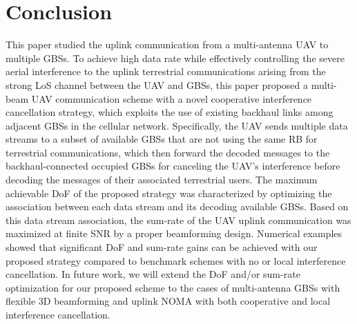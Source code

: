 \documentclass[onecolumn, draftclsnofoot, 12pt]{IEEEtran}
\begin{document}
\section{Conclusion}\label{sec:Conclusion}
This paper studied the uplink communication from a multi-antenna UAV to multiple GBSs. To achieve high data rate while effectively controlling the severe aerial interference to the uplink terrestrial communications arising from the strong LoS channel between the UAV and GBSs, this paper proposed a multi-beam UAV communication scheme with a novel cooperative interference cancellation strategy, which exploits the use of existing backhaul links among adjacent GBSs in the cellular network. Specifically, the UAV sends multiple data streams to a subset of available GBSs that are not using the same RB for terrestrial communications, which then forward the decoded messages to the backhaul-connected occupied GBSs for canceling the UAV's interference before decoding the messages of their associated terrestrial users. The maximum achievable DoF of the proposed strategy was characterized by optimizing the association between each data stream and its decoding available GBSs. Based on this data stream association, the sum-rate of the UAV uplink communication was maximized at finite SNR by a proper beamforming design. Numerical examples showed that significant DoF and sum-rate gains can be achieved with our proposed strategy compared to benchmark schemes with no or local interference cancellation. In future work, we will extend the DoF and/or sum-rate optimization for our proposed scheme to the cases of multi-antenna GBSs with flexible 3D beamforming and uplink NOMA with both cooperative and local interference cancellation.
\end{document}
